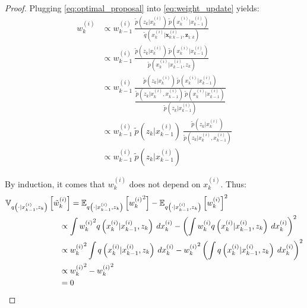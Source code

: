 \begin{proof}
	Plugging \eqref{eq:optimal_proposal} into \eqref{eq:weight_update} yields:
	\begin{equation}
		\begin{aligned}
		w_k^{(i)}&\propto w_{k-1}^{(i)}\:\frac{\tilde{p}\left(z_k|x_k^{(i)}\right)\:\tilde{p}\left(x_k^{(i)}|x_{k-1}^{(i)}\right)}{\tilde{q}\left(x_k^{(i)}|\mathbf{x}_{0:k-1}^{(i)},\mathbf{z}_{1:k}\right)}\\
		&\propto w_{k-1}^{(i)}\:\frac{\tilde{p}\left(z_k|x_k^{(i)}\right)\:\tilde{p}\left(x_k^{(i)}|x_{k-1}^{(i)}\right)}{\tilde{p}\left(x_k^{(i)}|x_{k-1}^{(i)},z_k\right)}\\
		&\propto w_{k-1}^{(i)}\:\frac{\tilde{p}\left(z_k|x_k^{(i)}\right)\:\tilde{p}\left(x_k^{(i)}|x_{k-1}^{(i)}\right)}{\dfrac{\tilde{p}\left(z_k|x_k^{(i)},x_{k-1}^{(i)}\right)\:\tilde{p}\left(x_k^{(i)}|x_{k-1}^{(i)}\right)}{\tilde{p}\left(z_k|x_{k-1}^{(i)}\right)}}\\
		&\propto w_{k-1}^{(i)}\:\tilde{p}\left(z_k|x_{k-1}^{(i)}\right)\:\frac{\tilde{p}\left(z_k|x_k^{(i)}\right)}{\tilde{p}\left(z_k|x_k^{(i)},x_{k-1}^{(i)}\right)}\\
		&\propto w_{k-1}^{(i)}\:\tilde{p}\left(z_k|x_{k-1}^{(i)}\right)
		\end{aligned}
	\end{equation}

	By induction, it comes that $w_k^{(i)}$ does not depend on $x_k^{(i)}$. Thus:
	\begin{equation}
		\begin{aligned}
		\mathbb{V}_{q\left(\cdot|x_{k-1}^{(i)},z_k\right)}\left[\tilde{w}_k^{(i)}\right]\hspace{-5mm}&\hspace{5mm}=\mathbb{E}_{q\left(\cdot|x_{k-1}^{(i)},z_k\right)}\left[{w_k^{(i)}}^2\right]-\mathbb{E}_{q\left(\cdot|x_{k-1}^{(i)},z_k\right)}\left[w_k^{(i)}\right]^2\\
		&\propto\int{{w_k^{(i)}}^2q\left(x_k^{(i)}|x_{k-1}^{(i)},z_k\right)\:dx_k^{(i)}}-\left(\int{w_k^{(i)}q\left(x_k^{(i)}|x_{k-1}^{(i)},z_k\right)\:dx_k^{(i)}}\right)^2\\
		&\propto{w_k^{(i)}}^2\int{q\left(x_k^{(i)}|x_{k-1}^{(i)},z_k\right)\:dx_k^{(i)}}-{w_k^{(i)}}^2\left(\int{q\left(x_k^{(i)}|x_{k-1}^{(i)},z_k\right)\:dx_k^{(i)}}\right)^2\\
		&\propto{w_k^{(i)}}^2-{w_k^{(i)}}^2\\
		&=0
		\end{aligned}
	\end{equation}
\end{proof}

